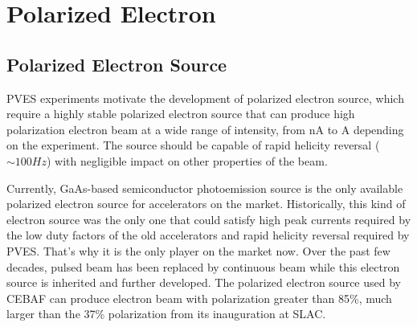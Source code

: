 \section{Polarized Electron}

\subsection{Polarized Electron Source}
PVES experiments motivate the development of polarized electron source, which 
require a highly stable polarized electron source that can produce
high polarization electron beam at a wide range of intensity, from nA to A 
depending on the experiment. The source should be capable of rapid helicity
reversal ($\sim 100 Hz$) with negligible impact on other properties of the beam.

Currently, GaAs-based semiconductor photoemission source is %
the only available polarized electron source for accelerators on the market.
Historically, this 
kind of electron source was the only one that could satisfy high peak currents 
required by the low duty factors of the old accelerators and rapid helicity 
reversal required by PVES. That's why it is the only player on the market now.
Over the past few decades, pulsed beam has been replaced by continuous beam while
this electron source is inherited and further developed. The polarized electron
source used by CEBAF can produce electron beam with polarization greater than
85\%, much larger than the 37\% polarization from its inauguration at SLAC. \cite{PRESCOTT1978347}

